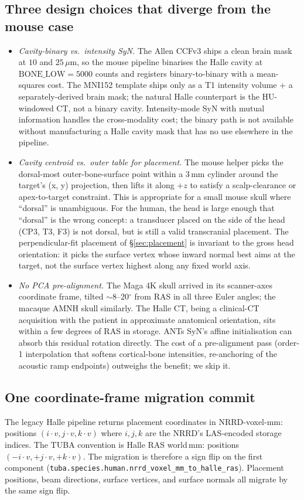 \documentclass{compactarticle}
\begin{document}
\subsection{Three design choices that diverge from the mouse case}
\begin{itemize}
\item {\em Cavity-binary vs.\ intensity SyN.} The Allen CCFv3 ships a
  clean brain mask at $10$ and $25$\,$\mu$m, so the mouse pipeline
  binarises the Halle cavity at $\mathrm{BONE\_LOW}=5000$ counts and
  registers binary-to-binary with a mean-squares cost. The MNI152
  template ships only as a T1 intensity volume + a separately-derived
  brain mask; the natural Halle counterpart is the HU-windowed CT, not
  a binary cavity. Intensity-mode SyN with mutual information handles
  the cross-modality cost; the binary path is not available without
  manufacturing a Halle cavity mask that has no use elsewhere in the
  pipeline.
\item {\em Cavity centroid vs.\ outer table for placement.} The mouse
  helper picks the dorsal-most outer-bone-surface point within a 3\,mm
  cylinder around the target's (x, y) projection, then lifts it along
  $+z$ to satisfy a scalp-clearance or apex-to-target constraint.
  This is appropriate for a small mouse skull where ``dorsal'' is
  unambiguous. For the human, the head is large enough that
  ``dorsal'' is the wrong concept: a transducer placed on the side of
  the head (CP3, T3, F3) is not dorsal, but is still a valid
  transcranial placement. The perpendicular-fit placement of
  \S\ref{sec:placement} is invariant to the gross head orientation: it
  picks the surface vertex whose inward normal best aims at the target,
  not the surface vertex highest along any fixed world axis.
\item {\em No PCA pre-alignment.} The Maga 4K skull arrived in its
  scanner-axes coordinate frame, tilted $\sim$8--20$^\circ$ from RAS in
  all three Euler angles; the macaque AMNH skull similarly. The Halle
  CT, being a clinical-CT acquisition with the patient in approximate
  anatomical orientation, sits within a few degrees of RAS in
  storage. ANTs SyN's affine initialisation can absorb this residual
  rotation directly. The cost of a pre-alignment pass (order-1
  interpolation that softens cortical-bone intensities, re-anchoring of
  the acoustic ramp endpoints) outweighs the benefit; we skip it.
\end{itemize}

\subsection{One coordinate-frame migration commit}
The legacy Halle pipeline returns placement coordinates in
NRRD-voxel-mm: positions $(i\cdot v, j\cdot v, k\cdot v)$ where $i, j,
k$ are the NRRD's LAS-encoded storage indices. The TUBA convention is
Halle RAS world\,mm: positions $(-i\cdot v, +j\cdot v, +k\cdot v)$.
The migration is therefore a sign flip on the first component
(\texttt{tuba.species.human.nrrd\_voxel\_mm\_to\_halle\_ras}).
Placement positions, beam directions, surface vertices, and surface
normals all migrate by the same sign flip.
\end{document}
